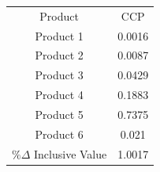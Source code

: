 \begin{tabular}{cc}
Product & CCP \\
Product 1 & 0.0016 \\
Product 2 & 0.0087 \\
Product 3 & 0.0429 \\
Product 4 & 0.1883 \\
Product 5 & 0.7375 \\
Product 6 & 0.021 \\
$\%\Delta$ Inclusive Value & 1.0017 \\
\end{tabular}